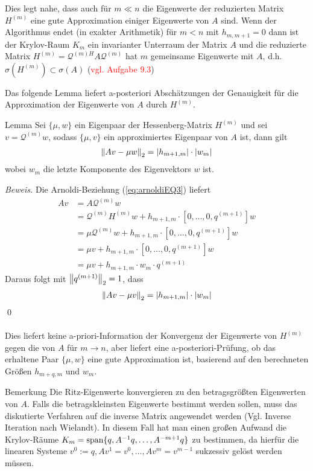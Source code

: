 Dies legt nahe, dass auch für $m\ll n$ die Eigenwerte der reduzierten Matrix $H^{(m)}$ eine gute Approximation 
einiger Eigenwerte von $A$ sind. Wenn der Algorithmus endet (in exakter Arithmetik) für $m<n$ mit $h_{m,m+1} = 0$ dann
ist der Krylov-Raum $K_m$ ein invarianter Unterraum der Matrix $A$ und die reduzierte Matrix $H^{(m)} = 
{\mathcal{Q}^{(m)H}} A \mathcal{Q}^{(m)}$ hat $m$ gemeinsame Eigenwerte mit $A$, 
d.h. $\sigma(H^{(m)})\subset \sigma(A)$ (\textcolor{red}{vgl. Aufgabe 9.3})

Das folgende Lemma liefert a-posteriori Abschätzungen der Genauigkeit für die Approximation der Eigenwerte von $A$ durch 
$H^{(m)}$.

\begin{colbox}{Lemma}
  Sei $\{\mu,w\}$ ein Eigenpaar der Hessenberg-Matrix $H^{(m)}$ und sei $v=\mathcal{Q}^{(m)}w$, sodass $\{\mu,v\}$ ein 
  approximiertes Eigenpaar von $A$ ist, dann gilt
  \begin{align*}
    \vertn{2}{Av-\mu w}_2 = |h_{m+1,m}|\cdot |w_m|
  \end{align*} 
  wobei $w_m$ die letzte Komponente des Eigenvektors $w$ ist.
\end{colbox}

\textit{Beweis.} Die Arnoldi-Beziehung (\ref{eq:arnoldiEQ3}) liefert
%
\begin{align*}
Av 
&= A\mathcal{Q}^{(m)}w\\ 
&= \mathcal{Q}^{(m)}H^{(m)}w + h_{m+1,m}\cdot[0,\dots,0,q^{(m+1)}]w \\
&= \mu \mathcal{Q}^{(m)}w + h_{m+1,m}\cdot[0,\dots,0,q^{(m+1)}]w \\
&= \mu v + h_{m+1,m}\cdot[0,\dots,0,q^{(m+1)}]w \\
&= \mu v + h_{m+1,m}\cdot w_m \cdot q^{(m+1)}
\end{align*}
%
Daraus folgt mit $\vertn{2}{q^{(m+1)}}_2 = 1$, dass
\begin{align*}\vertn{2}{Av-\mu v}_2 
  = |h_{m+1,m}|\cdot |w_m|
\end{align*}
\qed \\ \\
Dies liefert keine a-priori-Information der Konvergenz der Eigenwerte von $H^{(m)}$ gegen die von $A$ für $m\to n$, aber
liefert eine a-posteriori-Prüfung, ob das erhaltene Paar 
$\{\mu,w\}$ eine gute Approximation ist, basierend auf den berechneten Größen $h_{m+q,m}$ und $w_m$.

\begin{colbox}{Bemerkung}
  Die Ritz-Eigenwerte konvergieren zu den betragsgrößten Eigenwerten von $A$. Falls die betragskleinsten Eigenwerte 
  bestimmt werden sollen, muss das diskutierte Verfahren auf die inverse Matrix angewendet werden (Vgl. Inverse 
  Iteration nach Wielandt). In diesem Fall hat man einen großen Aufwand die Krylov-Räume 
  $K_m = \text{span}\{q,A^{-1}q,\dots,A^{-m+1}q\}$ zu bestimmen, da hierfür die linearen Systeme $v^0:=q, Av^1=v^0, 
  \dots, Av^m=v^{m-1}$ sukzessiv gelöst werden müssen.
\end{colbox}

